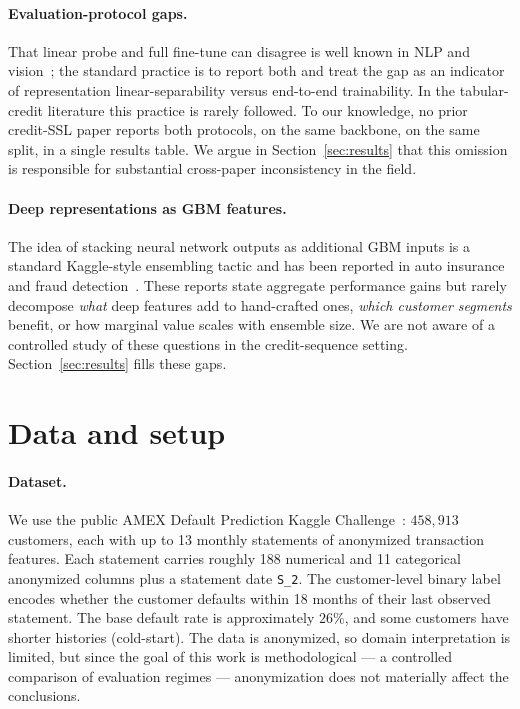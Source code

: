 \documentclass[sigconf, anonymous, review]{acmart}
\begin{document}
\paragraph{Evaluation-protocol gaps.}
That linear probe and full fine-tune can disagree is well known in
NLP and vision~\cite{Chen2020,He2022_MAE}; the standard practice is to
report both and treat the gap as an indicator of representation
linear-separability versus end-to-end trainability. In the
tabular-credit literature this practice is rarely followed. To our
knowledge, no prior credit-SSL paper reports both protocols, on the
same backbone, on the same split, in a single results table. We argue
in Section~\ref{sec:results} that this omission is responsible for
substantial cross-paper inconsistency in the field.

\paragraph{Deep representations as GBM features.}
The idea of stacking neural network outputs as additional GBM inputs
is a standard Kaggle-style ensembling tactic and has been reported in
auto insurance~\cite{Kang2022} and fraud detection~\cite{Lopez2020}.
These reports state aggregate performance gains but rarely decompose
\emph{what} deep features add to hand-crafted ones, \emph{which
customer segments} benefit, or how marginal value scales with
ensemble size. We are not aware of a controlled study of these
questions in the credit-sequence setting. Section~\ref{sec:results}
fills these gaps.

\section{Data and setup}
\label{sec:setup}

\paragraph{Dataset.}
We use the public AMEX Default Prediction Kaggle
Challenge~\cite{Kaggle2022}: $458{,}913$ customers, each with up to
13 monthly statements of anonymized transaction features. Each
statement carries roughly 188 numerical and 11 categorical anonymized
columns plus a statement date \texttt{S\_2}. The customer-level binary
label encodes whether the customer defaults within 18 months of their
last observed statement. The base default rate is approximately
$26\%$, and some customers have shorter histories (cold-start).
The data is anonymized, so domain interpretation is limited, but
since the goal of this work is methodological --- a controlled
comparison of evaluation regimes --- anonymization does not
materially affect the conclusions.
\end{document}
